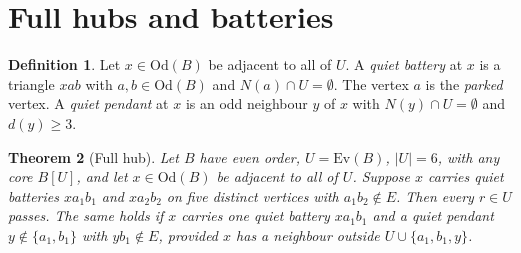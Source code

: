 \documentclass[11pt]{amsart}
\newtheorem{theorem}{Theorem}[section]
\theoremstyle{definition}
\newtheorem{definition}[theorem]{Definition}
\newcommand{\Ev}{\mathrm{Ev}}
\newcommand{\Od}{\mathrm{Od}}
\begin{document}
\section{Full hubs and batteries}\label{sec:fullhub}

\begin{definition}
Let $x\in\Od(B)$ be adjacent to all of $U$. A \emph{quiet battery} at $x$ is a triangle $xab$ with
$a,b\in\Od(B)$ and $N(a)\cap U=\emptyset$. The vertex $a$ is the \emph{parked} vertex. A
\emph{quiet pendant} at $x$ is an odd neighbour $y$ of $x$ with $N(y)\cap U=\emptyset$ and
$d(y)\ge3$.
\end{definition}

\begin{theorem}[Full hub]\label{thm:fullhub}
Let $B$ have even order, $U=\Ev(B)$, $|U|=6$, with any core $B[U]$, and let $x\in\Od(B)$ be
adjacent to all of $U$. Suppose $x$ carries quiet batteries $xa_1b_1$ and $xa_2b_2$ on five
distinct vertices with $a_1b_2\notin E$. Then every $r\in U$ passes. The same holds if $x$ carries
one quiet battery $xa_1b_1$ and a quiet pendant $y\notin\{a_1,b_1\}$ with $yb_1\notin E$, provided
$x$ has a neighbour outside $U\cup\{a_1,b_1,y\}$.
\end{theorem}
\end{document}
